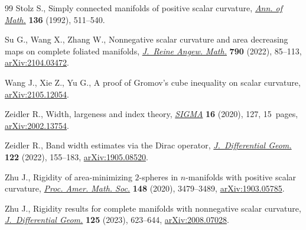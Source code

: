 \documentclass[pdftex]{sigma}
\numberwithin{equation}{section}
\begin{document}
\begin{thebibliography}{99}
Stolz S., Simply connected manifolds of positive scalar curvature, \href{https://doi.org/10.2307/2946598}{\textit{Ann.
  of Math.}} \textbf{136} (1992), 511--540.

Su G., Wang X., Zhang W., Nonnegative scalar curvature and area decreasing maps
  on complete foliated manifolds, \href{https://doi.org/10.1515/crelle-2022-0038}{\textit{J.~Reine Angew. Math.}} \textbf{790}
  (2022), 85--113, \href{https://arxiv.org/abs/2104.03472}{arXiv:2104.03472}.

Wang J., Xie Z., Yu G., A proof of {G}romov's cube inequality on scalar
  curvature, \href{https://arxiv.org/abs/2105.12054}{arXiv:2105.12054}.

Zeidler R., Width, largeness and index theory, \href{https://doi.org/10.3842/SIGMA.2020.127}{\textit{SIGMA}} \textbf{16}
  (2020), 127, 15~pages, \href{https://arxiv.org/abs/2002.13754}{arXiv:2002.13754}.

Zeidler R., Band width estimates via the {D}irac operator,
  \href{https://doi.org/10.4310/jdg/1668186790}{\textit{J.~Differential Geom.}} \textbf{122} (2022), 155--183,
  \href{https://arxiv.org/abs/1905.08520}{arXiv:1905.08520}.

Zhu J., Rigidity of area-minimizing {$2$}-spheres in {$n$}-manifolds with
  positive scalar curvature, \href{https://doi.org/10.1090/proc/15033}{\textit{Proc. Amer. Math. Soc.}} \textbf{148}
  (2020), 3479--3489, \href{https://arxiv.org/abs/1903.05785}{arXiv:1903.05785}.

Zhu J., Rigidity results for complete manifolds with nonnegative scalar
  curvature, \href{https://doi.org/10.4310/jdg/1701804153}{\textit{J.~Differential Geom.}} \textbf{125} (2023), 623--644,
  \href{https://arxiv.org/abs/2008.07028}{arXiv:2008.07028}.

\end{thebibliography}\LastPageEnding
\end{document}
